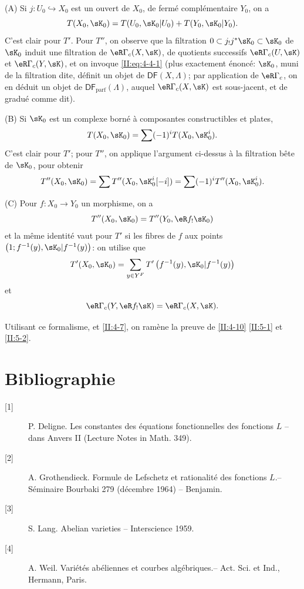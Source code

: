 (A) Si $j:U_0\hookrightarrow X_0$ est un ouvert de $X_0$, de fermé 
complémentaire $Y_0$, on a 
\[
  T(X_0,\sK_0) = T(U_0,\sK_0|U_0) + T(Y_0,\sK_0|Y_0) \text{.}
\]
C'est clair pour $T'$. Pour $T''$, on observe que la filtration 
$0\subset j_! j^* \sK_0\subset \sK_0$ de $\sK_0$ induit une filtration de 
$\eR\Gamma_c(X,\sK)$, de quotients successifs $\eR\Gamma_c(U,\sK)$ et 
$\eR\Gamma_c(Y,\sK)$, et on invoque \eqref{II:eq:4-4-1} (plus exactement 
énoncé: $\sK_0$, muni de la filtration dite, définit un objet de 
$\mathsf{DF}(X,\Lambda)$; par application de $\eR\Gamma_c$, on en déduit un 
objet de $\mathsf{DF}_\text{parf}(\Lambda)$, auquel $\eR\Gamma_c(X,\sK)$ est 
sous-jacent, et de gradué comme dit). 

(B) Si $\sK_0$ est un complexe borné à composantes constructibles et plates, 
\[
  T(X_0,\sK_0) = \sum (-1)^i T(X_0,\sK_0^i) \text{.}
\]
C'est clair pour $T'$; pour $T''$, on applique l'argument ci-dessus à la 
filtration bête de $\sK_0$, pour obtenir 
\[
  T''(X_0,\sK_0) = \sum T''(X_0,\sK_0^i[-i]) = \sum (-1)^i T''(X_0,\sK_0^i) \text{.}
\]

(C) Pour $f:X_0\to Y_0$ un morphisme, on a 
\[
  T''(X_0,\sK_0) = T''(Y_0,\eR f_! \sK_0)
\]
et la même identité vaut pour $T'$ si les fibres de $f$ aux points 
 $\left(1;f^{-1}(y),\sK_0|f^{-1}(y)\right)$: on 
utilise que 
\[
  T'(X_0,\sK_0) = \sum_{y\in Y^F} T'\left(f^{-1}(y), \sK_0|f^{-1}(y)\right)
\]
et 
\[
  \eR\Gamma_c(Y, \eR f_! \sK) = \eR\Gamma_c(X,\sK) \text{.}
\]

Utilisant ce formalisme, et \ref{II:4-7}, on ramène la preuve de \ref{II:4-10} 
 \ref{II:5-1} et \ref{II:5-2}.

\section*{Bibliographie}
\begin{description}
\item[{[1]}] P. Deligne. Les constantes des équations fonctionnelles des fonctions $L$ -- dans Anvers II (Lecture Notes in Math. 349).
\item[{[2]}] A. Grothendieck. Formule de Lefschetz et rationalité des fonctions $L$.-- Séminaire Bourbaki 279 (décembre 1964) -- Benjamin.
\item[{[3]}] S. Lang. Abelian varieties -- Interscience 1959.
\item[{[4]}] A. Weil. Variétés abéliennes et courbes algébriques.-- Act. Sci. et Ind., Hermann, Paris.
\end{description}
 



